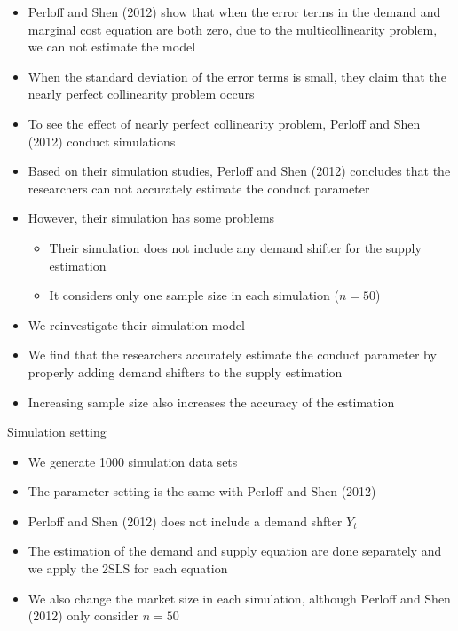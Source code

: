 \documentclass[aspectratio = 169]{beamer}
\theoremstyle{definition}
\begin{document}
\begin{frame}{}
    \begin{itemize}
        \item Perloff and Shen (2012) show that when the error terms in the demand and marginal cost equation are both zero, due to the multicollinearity problem, we can not estimate the model
        \item When the standard deviation of the error terms is small, they claim that the nearly perfect collinearity problem occurs
        \item To see the effect of nearly perfect collinearity problem, Perloff and Shen (2012) conduct simulations
        \item Based on their simulation studies, Perloff and Shen (2012) concludes that the researchers can not accurately estimate the conduct parameter
        
    \end{itemize}
\end{frame}

\begin{frame}{}
    \begin{itemize}
        \item However, their simulation has some problems
        \begin{itemize}
            \item Their simulation does not include any demand shifter for the supply estimation
            \item It considers only one sample size in each simulation ($n = 50$) 
        \end{itemize}
        \item We reinvestigate their simulation model
        \item We find that the researchers accurately estimate the conduct parameter by properly adding demand shifters to the supply estimation
        \item Increasing sample size also increases the accuracy of the estimation
    \end{itemize}
\end{frame}

\begin{frame}{Simulation setting}
    \begin{itemize}
        \item We generate 1000 simulation data sets
        \item The parameter setting is the same with Perloff and Shen (2012)
        \item Perloff and Shen (2012) does not include a demand shfter $Y_t$
        \item The estimation of the demand and supply equation are done separately and we apply the 2SLS for each equation
        \item We also change the market size in each simulation, although Perloff and Shen (2012) only consider $n = 50$
    \end{itemize}
\end{frame}
\end{document}
